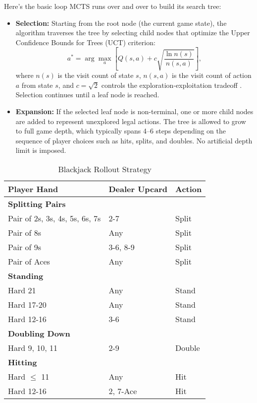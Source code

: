 \documentclass[12pt,a4paper]{cibb}
\begin{document}
Here’s the basic loop MCTS runs over and over to build its search tree:

\begin{itemize}
    \item \textbf{Selection:} Starting from the root node (the current game state), the algorithm traverses the tree by selecting child nodes that optimize the Upper Confidence Bounds for Trees (UCT) criterion:
    \[
    a^* = \arg\max_a \left[ Q(s, a) + c \sqrt{\frac{\ln n(s)}{n(s, a)}} \right],
    \]
    where $n(s)$ is the visit count of state $s$, $n(s, a)$ is the visit count of action $a$ from state $s$, and $c = \sqrt{2}$ controls the exploration-exploitation tradeoff \cite{kocsis2006bandit}. Selection continues until a leaf node is reached.

    \item \textbf{Expansion:} If the selected leaf node is non-terminal, one or more child nodes are added to represent unexplored legal actions. The tree is allowed to grow to full game depth, which typically spans 4–6 steps depending on the sequence of player choices such as hits, splits, and doubles. No artificial depth limit is imposed.
\end{itemize} 

\begin{table}[H]
    \centering
    \begin{tabular}{lll}
        \hline
        \textbf{Player Hand} & \textbf{Dealer Upcard} & \textbf{Action} \\
        \hline
        \multicolumn{3}{l}{\textbf{Splitting Pairs}} \\
        Pair of 2s, 3s, 4s, 5s, 6s, 7s & 2-7 & Split \\
        Pair of 8s & Any & Split \\
        Pair of 9s & 3-6, 8-9 & Split \\
        Pair of Aces & Any & Split \\
        \hline
        \multicolumn{3}{l}{\textbf{Standing}} \\
        Hard 21 & Any & Stand \\
        Hard 17-20 & Any & Stand \\
        Hard 12-16 & 3-6 & Stand \\
        \hline
        \multicolumn{3}{l}{\textbf{Doubling Down}} \\
        Hard 9, 10, 11 & 2-9 & Double \\
        \hline
        \multicolumn{3}{l}{\textbf{Hitting}} \\
        Hard $\leq$ 11 & Any & Hit \\ 
        Hard 12-16 & 2, 7-Ace & Hit \\
        \hline
    \end{tabular}
    \caption{Blackjack Rollout Strategy}
    \label{tab:blackjack_strategy} %
\end{table}
\end{document}
